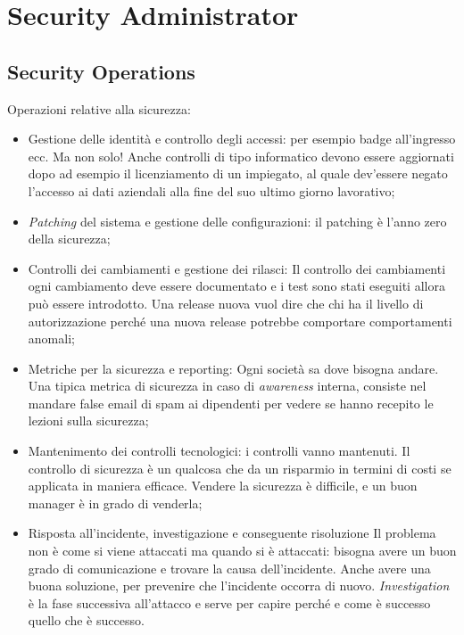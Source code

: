 
\chapter{Security Administrator}
\label{SA}

\section{Security Operations}
\label{SA:SO}

Operazioni relative alla sicurezza:
\begin{itemize}
\item Gestione delle identità e controllo degli accessi: per esempio badge 
all'ingresso ecc. Ma non solo! Anche controlli di tipo informatico devono essere 
aggiornati dopo ad esempio il licenziamento di un impiegato, al quale dev'essere 
negato l'accesso ai dati aziendali alla fine del suo ultimo giorno lavorativo;
\item \textit{Patching} del sistema e gestione delle configurazioni: il patching 
è l'anno zero della sicurezza;
\item Controlli dei cambiamenti e gestione dei rilasci: Il controllo dei 
cambiamenti ogni cambiamento deve essere documentato e i test sono stati 
eseguiti allora può essere introdotto.
Una release nuova vuol dire che chi ha il livello di autorizzazione perché una 
nuova release potrebbe comportare comportamenti anomali;
\item Metriche per la sicurezza e reporting: Ogni società sa dove bisogna 
andare. Una tipica metrica di sicurezza in caso di \emph{awareness} interna,
consiste nel mandare false email di spam ai dipendenti per vedere se
hanno recepito le lezioni sulla sicurezza;
\item Mantenimento dei controlli tecnologici: i controlli vanno mantenuti. 
Il controllo di sicurezza è un qualcosa che da un risparmio in termini di costi 
se applicata in maniera efficace. Vendere la sicurezza è difficile, e un buon 
manager è in grado di venderla;

\item Risposta all'incidente, investigazione e conseguente risoluzione
Il problema non è come si viene attaccati ma quando si è attaccati: bisogna 
avere un buon grado di comunicazione e trovare la causa dell'incidente. Anche 
avere una buona soluzione, per prevenire che l'incidente occorra di nuovo.
\textit{Investigation} è la fase successiva all'attacco e serve per capire 
perché e come è successo quello che è successo.

\end{itemize}


